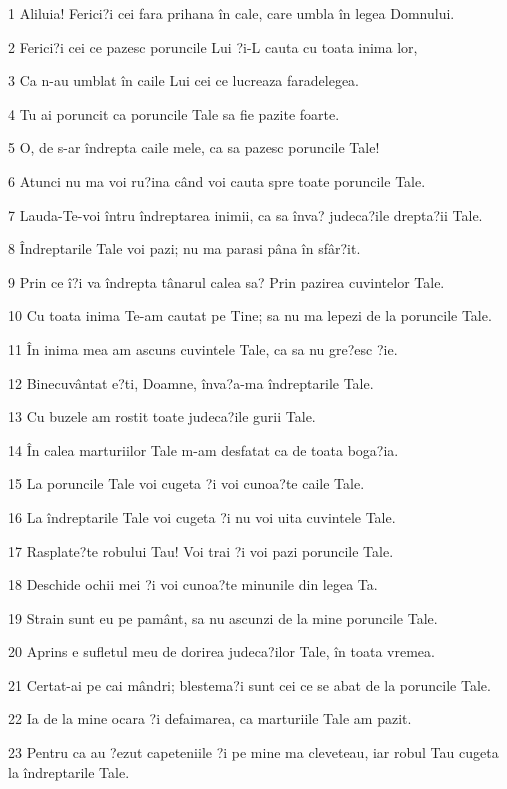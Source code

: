 \par 1 Aliluia! Ferici?i cei fara prihana în cale, care umbla în legea Domnului.
\par 2 Ferici?i cei ce pazesc poruncile Lui ?i-L cauta cu toata inima lor,
\par 3 Ca n-au umblat în caile Lui cei ce lucreaza faradelegea.
\par 4 Tu ai poruncit ca poruncile Tale sa fie pazite foarte.
\par 5 O, de s-ar îndrepta caile mele, ca sa pazesc poruncile Tale!
\par 6 Atunci nu ma voi ru?ina când voi cauta spre toate poruncile Tale.
\par 7 Lauda-Te-voi întru îndreptarea inimii, ca sa înva? judeca?ile drepta?ii Tale.
\par 8 Îndreptarile Tale voi pazi; nu ma parasi pâna în sfâr?it.
\par 9 Prin ce î?i va îndrepta tânarul calea sa? Prin pazirea cuvintelor Tale.
\par 10 Cu toata inima Te-am cautat pe Tine; sa nu ma lepezi de la poruncile Tale.
\par 11 În inima mea am ascuns cuvintele Tale, ca sa nu gre?esc ?ie.
\par 12 Binecuvântat e?ti, Doamne, înva?a-ma îndreptarile Tale.
\par 13 Cu buzele am rostit toate judeca?ile gurii Tale.
\par 14 În calea marturiilor Tale m-am desfatat ca de toata boga?ia.
\par 15 La poruncile Tale voi cugeta ?i voi cunoa?te caile Tale.
\par 16 La îndreptarile Tale voi cugeta ?i nu voi uita cuvintele Tale.
\par 17 Rasplate?te robului Tau! Voi trai ?i voi pazi poruncile Tale.
\par 18 Deschide ochii mei ?i voi cunoa?te minunile din legea Ta.
\par 19 Strain sunt eu pe pamânt, sa nu ascunzi de la mine poruncile Tale.
\par 20 Aprins e sufletul meu de dorirea judeca?ilor Tale, în toata vremea.
\par 21 Certat-ai pe cai mândri; blestema?i sunt cei ce se abat de la poruncile Tale.
\par 22 Ia de la mine ocara ?i defaimarea, ca marturiile Tale am pazit.
\par 23 Pentru ca au ?ezut capeteniile ?i pe mine ma cleveteau, iar robul Tau cugeta la îndreptarile Tale.
